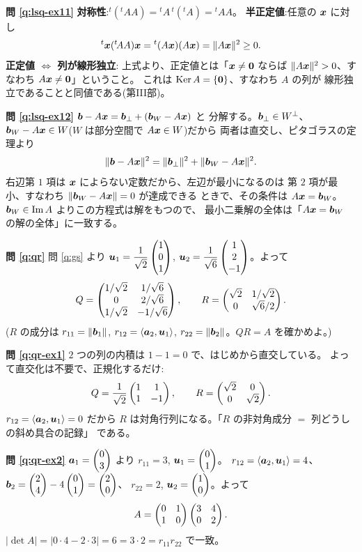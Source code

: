 \bigskip
\noindent\textbf{問 \ref{q:lsq-ex11}}\quad
\textbf{対称性}:${}^t({}^t\!AA) = {}^t\!A\,{}^t({}^t\!A) = {}^t\!AA$。
\textbf{半正定値}:任意の $\bm{x}$ に対し
\[
{}^t\bm{x}({}^t\!AA)\bm{x} = {}^t(A\bm{x})(A\bm{x})
= \|A\bm{x}\|^2 \ge 0.
\]
\textbf{正定値 $\iff$ 列が線形独立}:
上式より、正定値とは「$\bm{x} \neq \bm{0}$ ならば
$\|A\bm{x}\|^2 > 0$、すなわち $A\bm{x} \neq \bm{0}$」ということ。
これは $\mathrm{Ker}\,A = \{\bm{0}\}$、すなわち $A$ の列が
線形独立であることと同値である(第III部)。

\bigskip
\noindent\textbf{問 \ref{q:lsq-ex12}}\quad
$\bm{b} - A\bm{x} = \bm{b}_{\perp} + (\bm{b}_W - A\bm{x})$ と
分解する。$\bm{b}_{\perp} \in W^{\perp}$、
$\bm{b}_W - A\bm{x} \in W$($W$ は部分空間で $A\bm{x} \in W$)だから
両者は直交し、ピタゴラスの定理より
\[
\|\bm{b} - A\bm{x}\|^2
= \|\bm{b}_{\perp}\|^2 + \|\bm{b}_W - A\bm{x}\|^2.
\]
右辺第 $1$ 項は $\bm{x}$ によらない定数だから、左辺が最小になるのは
第 $2$ 項が最小、すなわち $\|\bm{b}_W - A\bm{x}\| = 0$ が達成できる
ときで、その条件は $A\bm{x} = \bm{b}_W$。
$\bm{b}_W \in \mathrm{Im}\,A$ よりこの方程式は解をもつので、
最小二乗解の全体は「$A\bm{x} = \bm{b}_W$ の解の全体」に一致する。

\bigskip
\noindent\textbf{問 \ref{q:qr}}\quad
問 \ref{q:gs} より
$\bm{u}_1 = \dfrac{1}{\sqrt{2}}\begin{pmatrix}1 \\ 0 \\ 1\end{pmatrix}$,
$\bm{u}_2 = \dfrac{1}{\sqrt{6}}\begin{pmatrix}1 \\ 2 \\ -1\end{pmatrix}$。よって
\[
Q = \begin{pmatrix}1/\sqrt{2} & 1/\sqrt{6} \\ 0 & 2/\sqrt{6} \\ 1/\sqrt{2} & -1/\sqrt{6}\end{pmatrix},
\qquad
R = \begin{pmatrix}\sqrt{2} & 1/\sqrt{2} \\ 0 & \sqrt{6}/2\end{pmatrix}.
\]
($R$ の成分は $r_{11} = \|\bm{b}_1\|$,
$r_{12} = \langle \bm{a}_2, \bm{u}_1 \rangle$,
$r_{22} = \|\bm{b}_2\|$。$QR = A$ を確かめよ。)

\bigskip
\noindent\textbf{問 \ref{q:qr-ex1}}\quad
$2$ つの列の内積は $1 - 1 = 0$ で、はじめから直交している。
よって直交化は不要で、正規化するだけ:
\[
Q = \frac{1}{\sqrt{2}}\begin{pmatrix}1 & 1 \\ 1 & -1\end{pmatrix}, \qquad
R = \begin{pmatrix}\sqrt{2} & 0 \\ 0 & \sqrt{2}\end{pmatrix}.
\]
$r_{12} = \langle \bm{a}_2, \bm{u}_1 \rangle = 0$ だから
$R$ は対角行列になる。「$R$ の非対角成分 $=$ 列どうしの斜め具合の記録」
である。

\bigskip
\noindent\textbf{問 \ref{q:qr-ex2}}\quad
$\bm{a}_1 = \begin{pmatrix}0 \\ 3\end{pmatrix}$ より $r_{11} = 3$,
$\bm{u}_1 = \begin{pmatrix}0 \\ 1\end{pmatrix}$。
$r_{12} = \langle \bm{a}_2, \bm{u}_1 \rangle = 4$、
$\bm{b}_2 = \begin{pmatrix}2 \\ 4\end{pmatrix} - 4\begin{pmatrix}0 \\ 1\end{pmatrix} = \begin{pmatrix}2 \\ 0\end{pmatrix}$、
$r_{22} = 2$, $\bm{u}_2 = \begin{pmatrix}1 \\ 0\end{pmatrix}$。よって
\[
A = \begin{pmatrix}0 & 1 \\ 1 & 0\end{pmatrix}\begin{pmatrix}3 & 4 \\ 0 & 2\end{pmatrix}.
\]
$|\det A| = |0 \cdot 4 - 2 \cdot 3| = 6 = 3 \cdot 2 = r_{11}r_{22}$ で一致。

